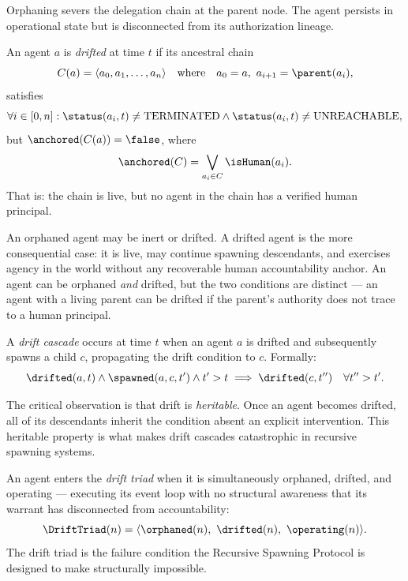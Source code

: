 Orphaning severs the delegation chain at the parent node. The agent persists in operational state but is disconnected from its authorization lineage.

\begin{definition}
\label{def:drifted}
An agent $a$ is \emph{drifted} at time $t$ if its ancestral chain
\begin{equation}
C(a) = \langle a_0, a_1, \ldots, a_n \rangle
\quad \text{where} \quad a_0 = a,\ a_{i+1} = \parent(a_i),
\end{equation}
satisfies
\begin{equation}
\forall i \in [0, n]: \status(a_i, t) \neq \text{TERMINATED} \land \status(a_i, t) \neq \text{UNREACHABLE},
\end{equation}
but $\anchored(C(a)) = \false$, where
\begin{equation}
\anchored(C) = \bigvee_{a_i \in C} \isHuman(a_i).
\end{equation}
That is: the chain is live, but no agent in the chain has a verified human principal.
\end{definition}

An orphaned agent may be inert or drifted. A drifted agent is the more consequential case: it is live, may continue spawning descendants, and exercises agency in the world without any recoverable human accountability anchor. An agent can be orphaned \emph{and} drifted, but the two conditions are distinct — an agent with a living parent can be drifted if the parent's authority does not trace to a human principal.

\begin{definition}
\label{def:drift-cascade}
A \emph{drift cascade} occurs at time $t$ when an agent $a$ is drifted and subsequently spawns a child $c$, propagating the drift condition to $c$. Formally:
\begin{equation}
\drifted(a, t) \land \spawned(a, c, t') \land t' > t \implies \drifted(c, t'') \quad \forall t'' > t'.
\end{equation}
\end{definition}

The critical observation is that drift is \emph{heritable}. Once an agent becomes drifted, all of its descendants inherit the condition absent an explicit intervention. This heritable property is what makes drift cascades catastrophic in recursive spawning systems.

\begin{definition}
\label{def:drift-triad}
An agent enters the \emph{drift triad} when it is simultaneously orphaned, drifted, and operating — executing its event loop with no structural awareness that its warrant has disconnected from accountability:
\begin{equation}
\DriftTriad(n) = \langle \orphaned(n),\ \drifted(n),\ \operating(n) \rangle.
\label{eq:drift-triad}
\end{equation}
The drift triad is the failure condition the Recursive Spawning Protocol is designed to make structurally impossible.
\end{definition}

